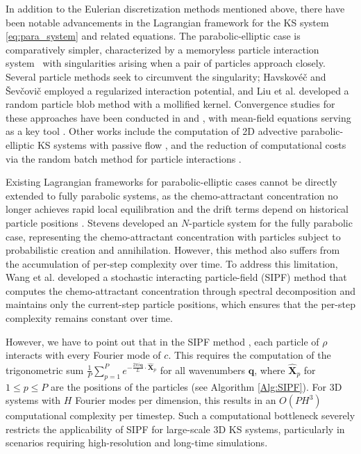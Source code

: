 \documentclass[review,onefignum,onetabnum]{siamart250211}
\begin{document}
In addition to the Eulerian discretization methods mentioned above, there have been notable advancements in the Lagrangian framework for the KS system \eqref{eq:para_system} and related equations. The parabolic-elliptic case is comparatively simpler, characterized by a memoryless particle interaction system~\cite{velazquez2004point} with singularities arising when a pair of particles approach closely. Several particle methods seek to circumvent the singularity; Havskovéč and Ševčovič \cite{havskovec2009stochastic} employed a regularized interaction potential, and Liu et al. \cite{liu2017random} developed a random particle blob method with a mollified kernel. Convergence studies for these approaches have been conducted in \cite{havskovec2011convergence, mischler2013kac} and \cite{liu2019propagation}, with mean-field equations serving as a key tool \cite{mischler2013kac}. Other works include the computation of 2D advective parabolic-elliptic KS systems with passive flow \cite{khan2015global}, and the reduction of computational costs via the random batch method for particle interactions \cite{random_batch}.

Existing Lagrangian frameworks for parabolic-elliptic cases cannot be directly extended to fully parabolic systems, as the chemo-attractant concentration no longer achieves rapid local equilibration and the drift terms depend on historical particle positions \cite{chen2022mean, fournier2023particle}. Stevens \cite{stevens2000} developed an $N$-particle system for the fully parabolic case, representing the chemo-attractant concentration with particles subject to probabilistic creation and annihilation. However, this method also suffers from the accumulation of per-step complexity over time. To address this limitation, Wang et al. \cite{SIPF1} developed a stochastic interacting particle-field (SIPF) method that computes the chemo-attractant concentration through spectral decomposition and maintains only the current-step particle positions, which ensures that the per-step complexity remains constant over time.

However, we have to point out that in the SIPF method \cite{SIPF1}, each particle of $\rho$ interacts with every Fourier mode of $c$. This requires the computation of the trigonometric sum $\frac{1}{P}\sum_{p=1}^P e^{-\frac{2\pi i \mathbf{q}}{L}\cdot \widehat{\mathbf{X}}_p}$ for all wavenumbers $\mathbf{q}$, where $\widehat{\mathbf{X}}_p$ for $1\leq p \leq P$ are the positions of the particles (see Algorithm \ref{Alg:SIPF}). For 3D systems with $H$ Fourier modes per dimension, this results in an $O(PH^3)$ computational complexity per timestep. Such a computational bottleneck severely restricts the applicability of SIPF for large-scale 3D KS systems, particularly in scenarios requiring high-resolution and long-time simulations.
\end{document}
